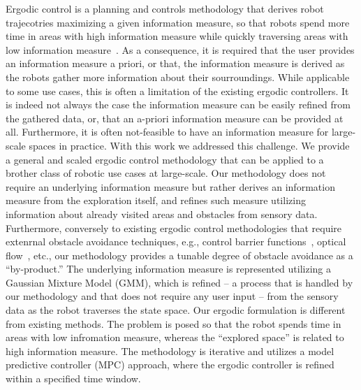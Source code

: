 \documentclass[letterpaper,10pt,conference,twoside]{IEEEtran}
\theoremstyle{definition}
\begin{document}
Ergodic control is a planning and controls methodology that derives robot trajecotries maximizing a given information measure, so that robots spend more time in areas with high information measure while quickly traversing areas with low information measure~\cite{mathew2011metrics,abraham2017ergodic,miller2013trajectory}. As a consequence, it is required that the user provides an information measure a priori, or that, the information measure is derived as the robots gather more information about their sourroundings. 
While applicable to some use cases, this is often a limitation of the existing ergodic controllers. It is indeed not always the case the information measure can be easily refined from the gathered data, or, that an a-priori information measure can be provided at all. Furthermore, it is often not-feasible to have an information measure for large-scale spaces in practice. 
With this work we addressed this challenge. We provide a general and scaled ergodic control methodology that can be applied to a brother class of robotic use cases at large-scale. Our methodology does not require an underlying information measure but rather derives an information measure from the exploration itself, and refines such measure utilizing information about already visited areas and obstacles from sensory data. 
Furthermore, conversely to existing ergodic control methodologies that require extenrnal obstacle avoidance techniques, e.g., control barrier functions~\cite{lerch2023safety}, optical flow~\cite{prabhakar2020ergodic}, etc., our methodology provides a tunable degree of obstacle avoidance as a ``by-product.'' 
%
The underlying information measure is represented utilizing a Gaussian Mixture Model (GMM), which is refined -- a process that is handled by our methodology and that does not require any user input -- from the sensory data as the robot traverses the state space. Our ergodic formulation is different from existing methods. The problem is posed so that the robot spends time in areas with low infromation measure, whereas the ``explored space'' is related to high information measure. 
The methodology is iterative and utilizes a model predictive controller (MPC) approach, where the ergodic controller is refined within a specified time window. 
\end{document}
